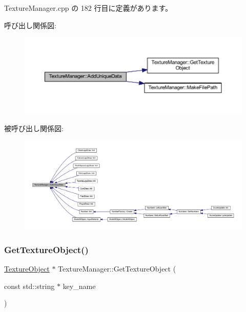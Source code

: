  Texture\+Manager.\+cpp の 182 行目に定義があります。

呼び出し関係図\+:\nopagebreak
\begin{figure}[H]
\begin{center}
\leavevmode
\includegraphics[width=350pt]{class_texture_manager_af86003fd2afaf09f0295745d486e42e4_cgraph}
\end{center}
\end{figure}
被呼び出し関係図\+:\nopagebreak
\begin{figure}[H]
\begin{center}
\leavevmode
\includegraphics[width=350pt]{class_texture_manager_af86003fd2afaf09f0295745d486e42e4_icgraph}
\end{center}
\end{figure}
\mbox{\label{class_texture_manager_a18d1f3418511075804f9d11cff1010ff}} 
\subsubsection{\texorpdfstring{Get\+Texture\+Object()}{GetTextureObject()}}
{\footnotesize\ttfamily \mbox{\hyperlink{class_texture_object}{Texture\+Object}} $\ast$ Texture\+Manager\+::\+Get\+Texture\+Object (\begin{DoxyParamCaption}\item[{const std\+::string $\ast$}]{key\+\_\+name }\end{DoxyParamCaption})\hspace{0.3cm}{\ttfamily [static]}}



